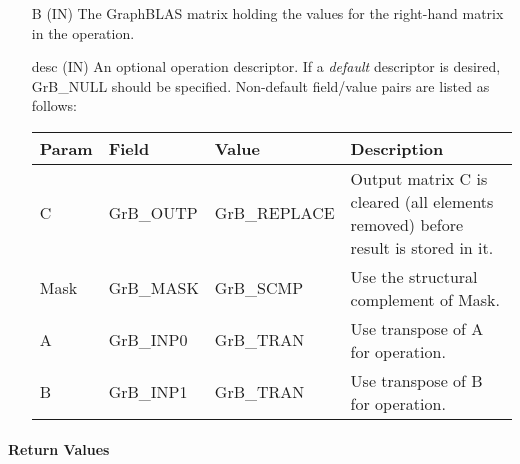 \begin{itemize}[leftmargin=1.1in]
    \item[{\sf B}]     ({\sf IN}) The GraphBLAS matrix holding the values for
    the right-hand matrix in the operation.

    \item[{\sf desc}] ({\sf IN}) An optional operation descriptor. If
    a \emph{default} descriptor is desired, {\sf GrB\_NULL} should be
    specified. Non-default field/value pairs are listed as follows:  \\

    \begin{tabular}{lllp{2.5in}}
        Param & Field  & Value & Description \\
        \hline
        {\sf C}    & {\sf GrB\_OUTP} & {\sf GrB\_REPLACE} & Output matrix {\sf C} is cleared (all elements removed) before result is stored in it.\\
        {\sf Mask} & {\sf GrB\_MASK} & {\sf GrB\_SCMP}   & Use the structural complement of {\sf Mask}. \\
        {\sf A}    & {\sf GrB\_INP0} & {\sf GrB\_TRAN}   & Use transpose of {\sf A} for operation. \\
        {\sf B}    & {\sf GrB\_INP1} & {\sf GrB\_TRAN}   & Use transpose of {\sf B} for operation. \\
    \end{tabular}
\end{itemize}

\paragraph{Return Values}

